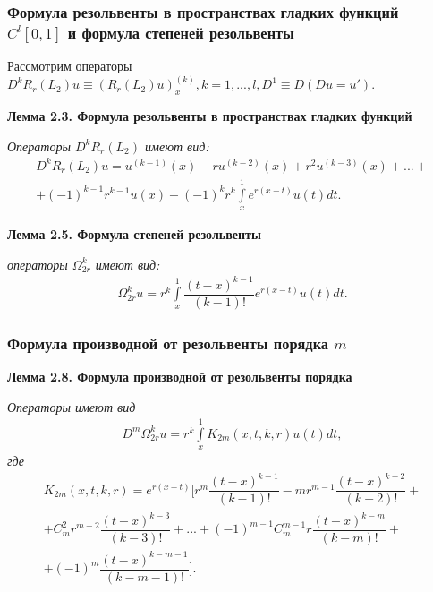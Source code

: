 \documentclass[10pt,utf8,presentation,notheorems]{beamer}
\theoremstyle{plain}
\theoremstyle{definition}
\begin{document}
\begin{frame}
\frametitle{Формула резольвенты в пространствах гладких функций $ C^l[0,1] $ и формула степеней резольвенты}
Рассмотрим операторы $ D^kR_r(L_2)u \equiv (R_r(L_2)u)_x^{(k)}, k = 1,...,l, D^1 \equiv D (Du = u') $.

\label{lemma2.3}
\textbf{Лемма 2.3. Формула резольвенты в пространствах гладких функций}

\textit{Операторы $ D^kR_r(L_2) $ имеют вид:}
\begin{equation}
\begin{array}{c}
D^kR_r(L_2)u = u^{(k-1)}(x) - ru^{(k-2)}(x) + r^2u^{(k-3)}(x) + ... + \\
+ (-1)^{k-1}r^{k-1}u(x) + (-1)^kr^k\int\limits_x^1 e^{r(x-t)}u(t)dt.
\end{array}
\end{equation}

\label{lemma2.5}
\textbf{Лемма 2.5. Формула степеней резольвенты}

\textit{операторы $ \Omega_{2r}^k $ имеют вид:}
\begin{equation}
\begin{array}{c}
\Omega_{2r}^ku = r^k\int\limits_x^1 \dfrac{(t-x)^{k-1}}{(k-1)!}e^{r(x-t)}u(t)dt.
\end{array}
\end{equation}
\end{frame}

\begin{frame}
\frametitle{Формула производной от резольвенты порядка $ m $}

\label{lemma2.8}
\textbf{Лемма 2.8. Формула производной от резольвенты порядка}

\textit{Операторы  имеют вид}
\begin{equation}
\begin{array}{c}
D^m\Omega_{2r}^ku = r^k\int\limits_x^1 K_{2m}(x,t,k,r)u(t)dt,
\end{array}
\end{equation}
\textit{где}
\begin{equation}
\begin{array}{c}
K_{2m}(x,t,k,r) = e^{r(x-t)} \biggl[ r^m\dfrac{(t-x)^{k-1}}{(k-1)!} - mr^{m-1}\dfrac{(t-x)^{k-2}}{(k-2)!} + \\ + C_m^2r^{m-2}\dfrac{(t-x)^{k-3}}{(k-3)!} + ... + (-1)^{m-1}C_m^{m-1}r\dfrac{(t-x)^{k-m}}{(k-m)!} + \\ + (-1)^m\dfrac{(t-x)^{k-m-1}}{(k-m-1)!}\biggr].
\end{array}
\end{equation}
\end{frame}
\end{document}
